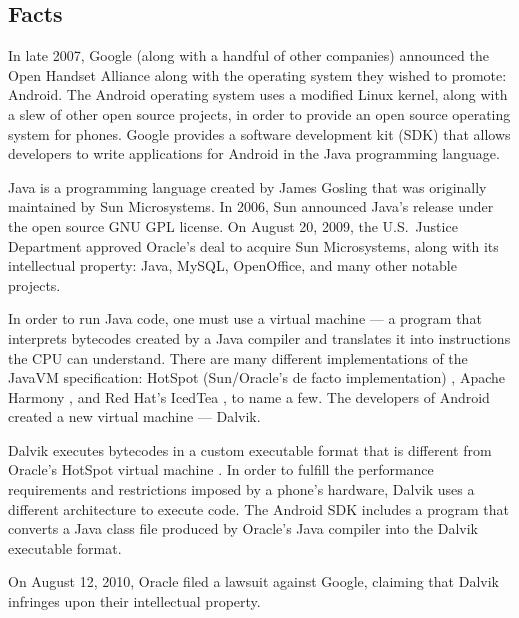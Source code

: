 \documentclass[11pt]{article}
\begin{document}
\begin{multicols}{2}
\setcounter{page}{1}

\section{Facts} %

In late 2007, Google (along with a handful of other companies) announced the
Open Handset Alliance \cite{open-handset-alliance-ann} along with the operating
system they wished to promote: Android.  The Android operating system uses a
modified Linux kernel, along with a slew of other open source projects, in
order to provide an open source operating system for phones.  Google provides a
software development kit (SDK) that allows developers to write applications for
Android in the Java programming language.

Java is a programming language created by James Gosling that was originally
maintained by Sun Microsystems.  In 2006, Sun announced Java's release under the
open source GNU GPL license. \cite{sun-open-sources-java} On August 20, 2009,
the U.S.~Justice Department approved Oracle's deal to acquire Sun Microsystems,
along with its intellectual property: Java, MySQL, OpenOffice, and many other
notable projects. \cite{oracle-buys-sun}

In order to run Java code, one must use a virtual machine --- a program that
interprets bytecodes created by a Java compiler and translates it into
instructions the CPU can understand. \cite{javavm-bytecode} There are many
different implementations of the JavaVM specification: HotSpot (Sun/Oracle's de
facto implementation) \cite{hotspot}, Apache Harmony \cite{apache-harmony}, and
Red Hat's IcedTea \cite{icedtea}, to name a few.  The developers of Android
created a new virtual machine --- Dalvik.

Dalvik executes bytecodes in a custom executable format \cite{dalvik-bytecode}
that is different from Oracle's HotSpot virtual machine \cite{javavm-bytecode}.
In order to fulfill the performance requirements and restrictions imposed by a
phone's hardware, Dalvik uses a different architecture to execute code.  The
Android SDK includes a program that converts a Java class file produced by
Oracle's Java compiler into the Dalvik executable format.
\cite{android-sdk-building}

On August 12, 2010, Oracle filed a lawsuit against Google, claiming that Dalvik
infringes upon their intellectual property. \cite{oracle-lawsuit}


\end{multicols}
\end{document}
